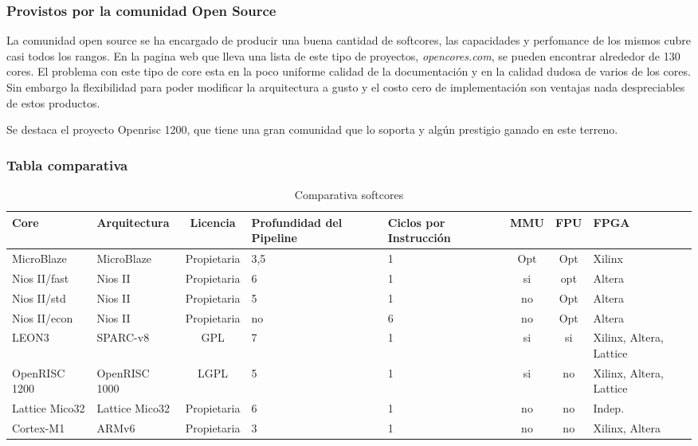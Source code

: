 \subsubsection{Provistos por la comunidad Open Source}
La comunidad open source se ha encargado de producir una buena cantidad de softcores, las capacidades y perfomance de los mismos cubre casi todos los rangos. En la pagina web que lleva una lista de este tipo de proyectos, \textit{opencores.com}, se pueden encontrar alrededor de 130 cores. El problema con este tipo de core esta en la poco uniforme calidad de la documentación y en la calidad dudosa de varios de los cores. Sin embargo la flexibilidad para poder modificar la arquitectura a gusto y el costo cero de implementación son ventajas nada despreciables de estos productos. 

Se destaca el proyecto Openrisc 1200, que tiene una gran comunidad que lo soporta y algún prestigio ganado en este terreno.


\subsubsection{Tabla comparativa}
																																						 \newpage																												
\begin{table}


	\centering
	\begin{tabular}{|p{1.65cm}|p{1.98cm}|c|p{2.2cm}|p{1.5cm}|c|c|p{1.5cm}|} \hline
		Core & Arquitectura & Licencia & Profundidad del Pipeline & Ciclos por Instrucción & MMU & FPU & FPGA \\ \hline
		MicroBlaze & MicroBlaze & Propietaria & 3,5 & 1 & Opt & Opt & Xilinx\\ \hline
		Nios II/fast & Nios II & Propietaria & 6 & 1 & si & opt & Altera \\ \hline
		Nios II/std & Nios II & Propietaria & 5 & 1 & no & Opt & Altera \\ \hline
		Nios II/econ & Nios II & Propietaria & no & 6 & no & Opt & Altera \\ \hline
		LEON3 & SPARC-v8 & GPL & 7 & 1 & si & si & Xilinx, Altera, Lattice \\ \hline
		OpenRISC 1200 & OpenRISC 1000 & LGPL & 5 & 1 & si & no & Xilinx, Altera, Lattice \\ \hline
		Lattice Mico32 & Lattice Mico32 & Propietaria & 6 & 1 & no & no & Indep. \\ \hline
		Cortex-M1 & ARMv6 & Propietaria & 3 & 1 & no & no & Xilinx, Altera \\ \hline
	\end{tabular}
	\caption{Comparativa softcores}
	\label{tab:comp}
\end{table}

